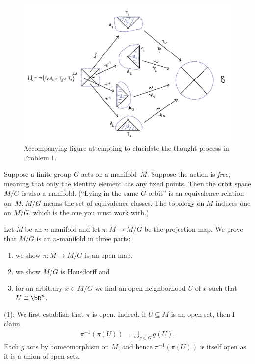 \begin{homework}[e]
	\begin{figure}[h]
		\centering
		\includegraphics[width=15cm]{./figures/hwk0-fig.png}
		\caption{Accompanying figure attempting to elucidate the thought process in Problem 1.}
		\label{fig:prob1}
	\end{figure}

	\prob Suppose a finite group $G$ acts on a manifold~$M$.  Suppose the action is \emph{free}, meaning that only the identity element has any fixed points.  Then the orbit space $M/G$ is also a manifold.  (``Lying in the same $G$-orbit'' is an equivalence relation on~$M$.  $M/G$ means the set of equivalence classes.  The topology on $M$ induces one on $M/G$, which is the one you must work with.)
	\begin{prf}
		Let $M$ be an $n$-manifold and let $\pi:M\to M/G$ be the projection map. We prove that $M/G$ is an $n$-manifold in three parts:
		\begin{enumerate}[(1)]
			\item we show $\pi:M\to M/G$ is an open map,
			\item we show $M/G$ is Hausdorff and 
			\item for an arbitrary $x \in M/G$ we find an open neighborhood $U$ of $x$ such that $U \cong \bR^n$.
		\end{enumerate}
		\noindent (1): \hspace{1em} We first establish that $\pi$ is open. Indeed, if $U \subseteq M$ is an open set, then I claim
		\begin{align*}
			\pi^{-1}(\pi(U)) = \bigcup_{g\in G} g(U).
		\end{align*}
		Each $g$ acts by homeomorphism on $M$, and hence $\pi^{-1}(\pi(U))$ is itself open as it is a union of open sets. 


\end{prf}
\end{homework}
